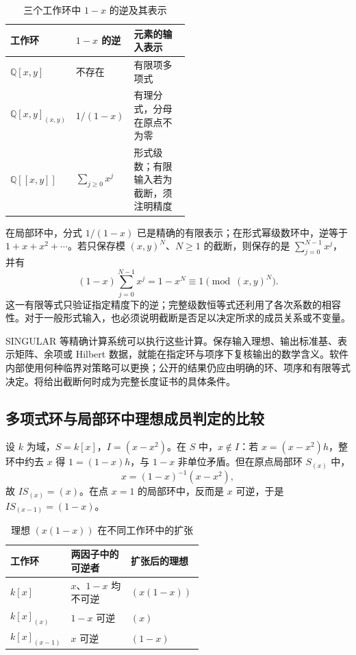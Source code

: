 \begin{table}[htbp]
	\centering
	\caption{三个工作环中 \(1-x\) 的逆及其表示}
	\label{b3:tab:B-inverse-models}
	\begin{tabularx}{\linewidth}{@{}>{\raggedright\arraybackslash}p{0.29\linewidth}>{\raggedright\arraybackslash}p{0.23\linewidth}>{\raggedright\arraybackslash}X@{}}
		\toprule
		工作环 & \(1-x\) 的逆 & 元素的输入表示 \\
		\midrule
		\(\mathbb Q[x,y]\) & 不存在 & 有限项多项式 \\
		\(\mathbb Q[x,y]_{(x,y)}\) & \(1/(1-x)\) & 有理分式，分母在原点不为零 \\
		\(\mathbb Q[\![x,y]\!]\) & \(\sum_{j\ge0}x^j\) & 形式级数；有限输入若为截断，须注明精度 \\
		\bottomrule
	\end{tabularx}
\end{table}

在局部环中，分式 \(1/(1-x)\) 已是精确的有限表示；在形式幂级数环中，逆等于 \(1+x+x^2+\cdots\)。若只保存模 \((x,y)^N\)、\(N\ge1\) 的截断，则保存的是 \(\sum_{j=0}^{N-1}x^j\)，并有
\[
	(1-x)\sum_{j=0}^{N-1}x^j=1-x^N\equiv1\pmod{(x,y)^N}.
\]
这一有限等式只验证指定精度下的逆；完整级数恒等式还利用了各次系数的相容性。对于一般形式输入，也必须说明截断是否足以决定所求的成员关系或不变量。

\ProseParagraphBreak
SINGULAR 等精确计算系统可以执行这些计算。保存输入理想、输出标准基、表示矩阵、余项或 Hilbert 数据，就能在指定环与项序下复核输出的数学含义。软件内部使用何种临界对策略可以更换；公开的结果仍应由明确的环、项序和有限等式决定。将给出截断何时成为完整长度证书的具体条件。

\subsection{多项式环与局部环中理想成员判定的比较}
\label{b3:subsec:B04:04}

\begin{example}\label{b3:exm:B-local-membership}
	设 \(k\) 为域，\(S=k[x]\)，\(I=(x-x^2)\)。在 \(S\) 中，\(x\notin I\)：若 \(x=(x-x^2)h\)，整环中约去 \(x\) 得 \(1=(1-x)h\)，与 \(1-x\) 非单位矛盾。但在原点局部环 \(S_{(x)}\) 中，
	\[
		x=(1-x)^{-1}(x-x^2),
	\]
	故 \(IS_{(x)}=(x)\)。在点 \(x=1\) 的局部环中，反而是 \(x\) 可逆，于是 \(IS_{(x-1)}=(1-x)\)。
\end{example}

\begin{table}[htbp]
	\centering
	\caption{理想 \((x(1-x))\) 在不同工作环中的扩张}
	\label{b3:tab:B-local-ideal-comparison}
	\begin{tabularx}{\linewidth}{@{}>{\raggedright\arraybackslash}p{0.25\linewidth}>{\raggedright\arraybackslash}p{0.31\linewidth}>{\raggedright\arraybackslash}X@{}}
		\toprule
		工作环 & 两因子中的可逆者 & 扩张后的理想 \\
		\midrule
		\(k[x]\) & \(x\)、\(1-x\) 均不可逆 & \((x(1-x))\) \\
		\(k[x]_{(x)}\) & \(1-x\) 可逆 & \((x)\) \\
		\(k[x]_{(x-1)}\) & \(x\) 可逆 & \((1-x)\) \\
		\bottomrule
	\end{tabularx}
\end{table}

